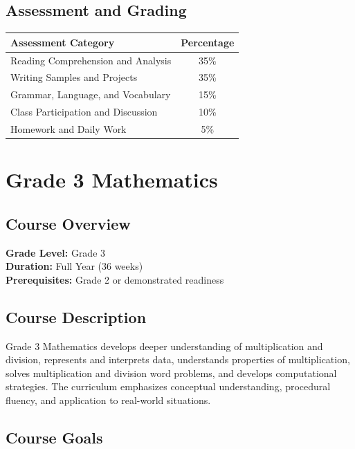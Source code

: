 \documentclass[11pt,letterpaper]{report}
\begin{document}
\section{Assessment and Grading}

\begin{center}
\begin{tabular}{|l|c|}
\hline
\textbf{Assessment Category} & \textbf{Percentage} \\
\hline
Reading Comprehension and Analysis & 35\% \\
\hline
Writing Samples and Projects & 35\% \\
\hline
Grammar, Language, and Vocabulary & 15\% \\
\hline
Class Participation and Discussion & 10\% \\
\hline
Homework and Daily Work & 5\% \\
\hline
\end{tabular}
\end{center}

\chapter{Grade 3 Mathematics}

\section{Course Overview}

\textbf{Grade Level:} Grade 3\\
\textbf{Duration:} Full Year (36 weeks)\\
\textbf{Prerequisites:} Grade 2 or demonstrated readiness

\section{Course Description}

Grade 3 Mathematics develops deeper understanding of multiplication and division, represents and interprets data, understands properties of multiplication, solves multiplication and division word problems, and develops computational strategies. The curriculum emphasizes conceptual understanding, procedural fluency, and application to real-world situations.

\section{Course Goals}
\end{document}
